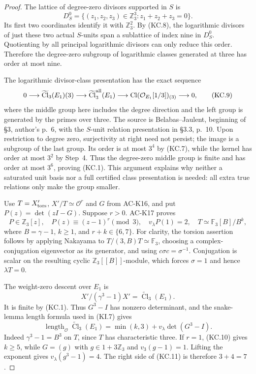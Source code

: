 \begin{proof}
The lattice of degree-zero divisors supported in $S$ is
\[
 D_S^0=\{(z_1,z_2,z_3)\in\mathbb Z_3^3:
                                z_1+z_2+z_3=0\}.
\]
Its first two coordinates identify it with $\mathbb Z_3^2$.
By (KC.8), the logarithmic divisors of just these two actual
$S$-units span a sublattice of index nine in $D_S^0$.
Quotienting by all principal logarithmic divisors can only
reduce this order.  Therefore the degree-zero subgroup of
logarithmic classes generated at three has order at most
nine.

The logarithmic divisor-class presentation has the exact
sequence
\[
 0\longrightarrow\widetilde{\operatorname{Cl}}_3(E_1)(3)
 \longrightarrow\widetilde{\operatorname{Cl}}_3^{\rm all}(E_1)
 \longrightarrow\operatorname{Cl}(\mathcal O_{E_1}[1/3])_{(3)}
 \longrightarrow0,                                    \tag{KC.9}
\]
where the middle group here includes the degree direction
and the left group is generated by the primes over three.
The source is Belabas--Jaulent, beginning of \S3, author's
p.~6, with the $S$-unit relation presentation in \S3.3,
p.~10.  Upon restriction to degree zero, surjectivity at
right need not persist; the image is a subgroup of the
last group.  Its order is at most $3^4$ by (KC.7), while
the kernel has order at most $3^2$ by Step~4.
Thus the degree-zero middle group is finite and has order
at most $3^6$, proving (KC.1).  This argument explains why
neither a saturated unit basis nor a full certified class
presentation is needed: all extra true relations only
make the group smaller.

Use $T=X'_{\rm tors}$, $X'/T\simeq\mathcal O^r$ and $G$
from AC-K16, and put $P(z)=\det(zI-G)$.
Suppose $r>0$.  AC-K17 proves
\[
 P\in\mathbb Z_3[z],\quad
 P(z)\equiv(z-1)^r\pmod3,\quad v_\lambda P(1)=2,
 \quad T\simeq\mathbb F_3[B]/B^k,
                                                               \tag{KC.10}
\]
where $B=\gamma-1$, $k\geq1$, and $r+k\in\{6,7\}$.
For clarity, the torsion assertion follows by applying
Nakayama to $T/(3,B)T\simeq\mathbb F_3$, choosing a
complex-conjugation eigenvector as its generator, and using
$c\sigma c=\sigma^{-1}$.  Conjugation is scalar on the
resulting cyclic $\mathbb Z_3[[B]]$-module, which forces
$\sigma=1$ and hence $\lambda T=0$.

The weight-zero descent over $E_1$ is
\[
                X'/(\gamma^3-1)X'
                       =\widetilde{\operatorname{Cl}}_3(E_1).
\]
It is finite by (KC.1).  Thus $G^3-I$ has nonzero determinant,
and the snake-lemma length formula used in (KI.7) gives
\[
 \operatorname{length}_{\mathcal O}
                  \widetilde{\operatorname{Cl}}_3(E_1)
   =\min(k,3)+v_\lambda\det(G^3-I).                  \tag{KC.11}
\]
Indeed $\gamma^3-1=B^3$ on $T$, since $T$ has characteristic
three.  If $r=1$, (KC.10) gives $k\geq5$, while
$G=(g)$ with $g\in1+3\mathbb Z_3$ and $v_3(g-1)=1$.
Lifting the exponent gives $v_\lambda(g^3-1)=4$.
The right side of (KC.11) is therefore $3+4=7$.


\end{proof}
